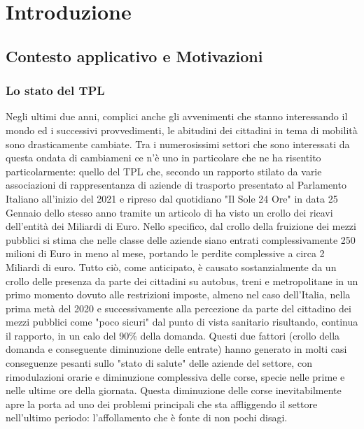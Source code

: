 \chapter{Introduzione}

\section{Contesto applicativo e Motivazioni} %
    \subsection{Lo stato del TPL}
    Negli ultimi due anni, complici anche gli avvenimenti che stanno interessando il mondo ed i successivi provvedimenti, le abitudini dei cittadini in tema di mobilità sono drasticamente cambiate.
    Tra i numerosissimi settori che sono interessati da questa ondata di cambiameni ce n'è uno in particolare che ne ha risentito particolarmente: quello del TPL che, secondo un rapporto \cite{statotpl} stilato da varie associazioni di rappresentanza di aziende di trasporto presentato al Parlamento Italiano all'inizio del 2021 e ripreso dal quotidiano "Il Sole 24 Ore" in data 25 Gennaio dello stesso anno tramite un articolo di \cite{statotplsole24ore} ha visto un crollo dei ricavi dell'entità dei Miliardi di Euro. Nello specifico, dal crollo della fruizione dei mezzi pubblici si stima che nelle classe delle aziende siano entrati complessivamente 250 milioni di Euro in meno al mese, portando le perdite complessive a circa 2 Miliardi di euro.
    Tutto ciò, come anticipato, è causato sostanzialmente da un crollo delle presenza da parte dei cittadini su autobus, treni e metropolitane in un primo momento dovuto alle restrizioni imposte, almeno nel caso dell'Italia, nella prima metà del 2020 e successivamente alla percezione da parte del cittadino dei mezzi pubblici come "poco sicuri" dal punto di vista sanitario risultando, continua il rapporto, in un calo del 90\% della domanda.
    Questi due fattori (crollo della domanda e conseguente diminuzione delle entrate) hanno generato in molti casi conseguenze pesanti sullo "stato di salute" delle aziende del settore, con rimodulazioni orarie e diminuzione complessiva delle corse, specie nelle prime e nelle ultime ore della giornata. Questa diminuzione delle corse inevitabilmente apre la porta ad uno dei problemi principali che sta affliggendo il settore nell'ultimo periodo: l'affollamento che è fonte di non pochi disagi.
    
